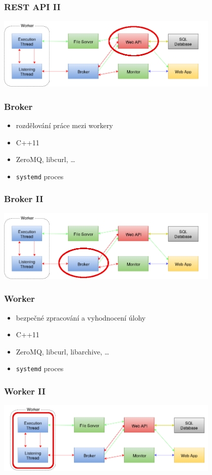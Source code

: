 \documentclass{beamer}
\begin{document}
\begin{frame}
	\frametitle{REST API II}
	\begin{center}
		\includegraphics[width=0.8\textwidth]{images/communication-webapi.png}
	\end{center}
\end{frame}

\begin{frame}
	\frametitle{Broker}
	\begin{itemize}
		\item rozdělování práce mezi workery
		\item C++11
		\item ZeroMQ, libcurl, \dots
		\item \texttt{systemd} proces
	\end{itemize}
\end{frame}

\begin{frame}
	\frametitle{Broker II}
	\begin{center}
		\includegraphics[width=0.8\textwidth]{images/communication-broker.png}
	\end{center}
\end{frame}

\begin{frame}
	\frametitle{Worker}
	\begin{itemize}
		\item bezpečné zpracování a vyhodnocení úlohy
		\item C++11
		\item ZeroMQ, libcurl, libarchive, \dots
		\item \texttt{systemd} proces
	\end{itemize}
\end{frame}

\begin{frame}
	\frametitle{Worker II}
	\begin{center}
		\includegraphics[width=0.8\textwidth]{images/communication-worker.png}
	\end{center}
\end{frame}
\end{document}
